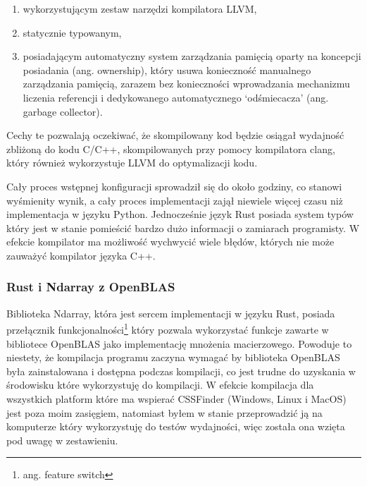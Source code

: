 \documentclass[11pt, a4paper]{article}
\begin{document}
\begin{sloppypar}
\begin{enumerate}
      \item wykorzystującym zestaw narzędzi kompilatora LLVM,

      \item statycznie typowanym,

      \item posiadającym automatyczny system zarządzania pamięcią oparty na koncepcji posiadania
        (ang. ownership), który usuwa konieczność manualnego zarządzania pamięcią,
        zarazem bez konieczności wprowadzania mechanizmu liczenia referencji i
        dedykowanego automatycznego `odśmiecacza' (ang. garbage collector).
    \end{enumerate}

    Cechy te pozwalają oczekiwać, że skompilowany kod będzie osiągał wydajność zbliżoną
    do kodu C/C++, skompilowanych przy pomocy kompilatora clang, który również
    wykorzystuje LLVM do optymalizacji kodu.

    Cały proces wstępnej konfiguracji sprowadził się do około godziny, co stanowi wyśmienity
    wynik, a cały proces implementacji zajął niewiele więcej czasu niż implementacja w
    języku Python. Jednocześnie język Rust posiada system typów który jest w stanie pomieścić
    bardzo dużo informacji o zamiarach programisty. W efekcie kompilator ma możliwość
    wychwycić wiele błędów, których nie może zauważyć kompilator języka C++.

    \subsubsection{Rust i Ndarray z OpenBLAS}
    Biblioteka Ndarray, która jest sercem implementacji w języku Rust, posiada przełącznik
    funkcjonalności\footnote{ang. feature switch} który pozwala wykorzystać funkcje
    zawarte w bibliotece OpenBLAS jako implementację mnożenia macierzowego. Powoduje to niestety,
    że kompilacja programu zaczyna wymagać by biblioteka OpenBLAS była zainstalowana i
    dostępna podczas kompilacji, co jest trudne do uzyskania w środowisku które wykorzystuję
    do kompilacji. W efekcie kompilacja dla wszystkich platform które ma wspierać
    CSSFinder (Windows, Linux i MacOS) jest poza moim zasięgiem, natomiast byłem w
    stanie przeprowadzić ją na komputerze który wykorzystuję do testów wydajności, więc została
    ona wzięta pod uwagę w zestawieniu.


\end{sloppypar}
\end{document}
